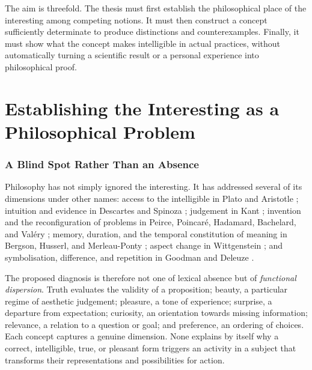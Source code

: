 \documentclass[11pt,a4paper]{article}
\begin{document}
The aim is threefold. The thesis must first establish the philosophical place of
the interesting among competing notions. It must then construct a concept
sufficiently determinate to produce distinctions and counterexamples. Finally,
it must show what the concept makes intelligible in actual practices, without
automatically turning a scientific result or a personal experience into
philosophical proof.

\part{Establishing the Interesting as a Philosophical Problem}

\section{A Blind Spot Rather Than an Absence}

Philosophy has not simply ignored the interesting. It has addressed several of
its dimensions under other names: access to the intelligible in Plato and
Aristotle
\parencite{platon2016republique,platon1995theetete,aristote1991metaphysique,aristote2005seconds};
intuition and evidence in Descartes and Spinoza
\parencite{descartes2002regles,descartes1992meditations,spinoza1966ethique};
judgement in Kant \parencite{kant2001raison,kant1993juger}; invention and the
reconfiguration of problems in Peirce, Poincaré, Hadamard, Bachelard, and Valéry
\parencite{peirce1955writings,poincare1908science,hadamard1959invention,bachelard1999formation,valery1973cahiers};
memory, duration, and the temporal constitution of meaning in Bergson, Husserl,
and Merleau-Ponty
\parencite{bergson2013evolution,bergson2013pensee,husserl1970experience,husserl1957logique,merleau1945phenomenologie};
aspect change in Wittgenstein \parencite{wittgenstein2004recherches}; and
symbolisation, difference, and repetition in Goodman and Deleuze
\parencite{goodman1976languages,deleuze1968difference}.

The proposed diagnosis is therefore not one of lexical absence but of
\emph{functional dispersion}. Truth evaluates the validity of a proposition;
beauty, a particular regime of aesthetic judgement; pleasure, a tone of
experience; surprise, a departure from expectation; curiosity, an orientation
towards missing information; relevance, a relation to a question or goal; and
preference, an ordering of choices. Each concept captures a genuine dimension.
None explains by itself why a correct, intelligible, true, or pleasant form
triggers an activity in a subject that transforms their representations and
possibilities for action.
\end{document}
